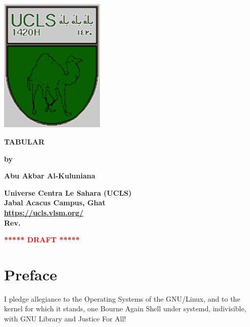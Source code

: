 \documentclass[12pt]{article}
\newcommand{\pengarangs}{%
    Abu Akbar Al-Kuluniana \\
}
\newcommand{\judul}{%
TABULAR
}
\begin{document}
\begin{titlepage}
    \begin{center}    
        \begin{center}
            \includegraphics[width=50mm]{ucls-coat-grey}
        \end{center}

    \vspace*{15mm}
    \textbf{\Large \judul}

    \vspace*{30mm}       
    \textbf{by}

    \vspace*{15mm}    
    \textbf{\Large \pengarangs}

    \vspace*{4.0cm}
    \textbf{
       Universe Centra Le Sahara (UCLS) \\
       Jabal Acacus Campus, Ghat        \\
       \url{https://ucls.vlsm.org/}     \\
       Rev. \rev%
    }

    \vspace*{5mm}    
    \textbf{\LARGE \textcolor{red}{***** DRAFT *****}}

    \end{center}

\end{titlepage}


\section*{Preface}
I pledge allegiance to the Operating Systems of the GNU/Linux,
and to the kernel for which it stands, one Bourne Again Shell under systemd,
indivisible, with GNU Library and Justice For All!

\vspace*{5mm}
\end{document}
